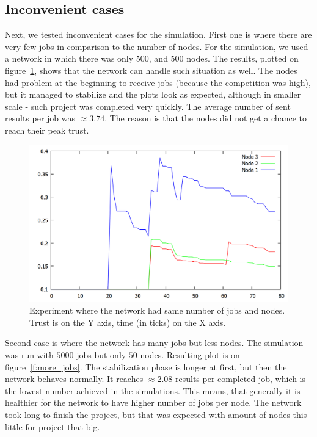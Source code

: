\FloatBarrier

\subsection{Inconvenient cases}

Next, we tested inconvenient cases for the simulation. First one is where there are very few jobs in comparison to the number of nodes. For the simulation, we used a network in which there was only $500$, and $500$ nodes. The results, plotted on figure~\ref{f:less_jobs}, shows that the network can handle such situation as well. The nodes had problem at the beginning to receive jobs (because the competition was high), but it managed to stabilize and the plots look as expected, although in smaller scale - such project was completed very quickly. The average number of sent results per job was $\approx 3.74$. The reason is that the nodes did not get a chance to reach their peak trust.

\begin{figure}
\centering
\includegraphics[width=\textwidth]{diagrams/trust_less_jobs.png}
\caption{Experiment where the network had same number of jobs and nodes. Trust is on the Y axis, time (in ticks) on the X axis.}
\label{f:less_jobs}
\end{figure}

Second case is where the network has many jobs but less nodes. The simulation was run with $5000$ jobs but only $50$ nodes. Resulting plot is on figure~\ref{f:more_jobs}. The stabilization phase is longer at first, but then the network behaves normally. It reaches $\approx 2.08$ results per completed job, which is the lowest number achieved in the simulations. This means, that generally it is healthier for the network to have higher number of jobs per node. The network took long to finish the project, but that was expected with amount of nodes this little for project that big.

